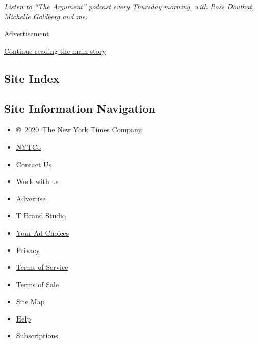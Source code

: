 \emph{Listen to}
\href{https://www.nytimes3xbfgragh.onion/column/the-argument}{\emph{``The
Argument'' podcast}} \emph{every Thursday morning, with Ross Douthat,
Michelle Goldberg and me.}

Advertisement

\protect\hyperlink{after-bottom}{Continue reading the main story}

\hypertarget{site-index}{%
\subsection{Site Index}\label{site-index}}

\hypertarget{site-information-navigation}{%
\subsection{Site Information
Navigation}\label{site-information-navigation}}

\begin{itemize}
\tightlist
\item
  \href{https://help.nytimes3xbfgragh.onion/hc/en-us/articles/115014792127-Copyright-notice}{©~2020~The
  New York Times Company}
\end{itemize}

\begin{itemize}
\tightlist
\item
  \href{https://www.nytco.com/}{NYTCo}
\item
  \href{https://help.nytimes3xbfgragh.onion/hc/en-us/articles/115015385887-Contact-Us}{Contact
  Us}
\item
  \href{https://www.nytco.com/careers/}{Work with us}
\item
  \href{https://nytmediakit.com/}{Advertise}
\item
  \href{http://www.tbrandstudio.com/}{T Brand Studio}
\item
  \href{https://www.nytimes3xbfgragh.onion/privacy/cookie-policy\#how-do-i-manage-trackers}{Your
  Ad Choices}
\item
  \href{https://www.nytimes3xbfgragh.onion/privacy}{Privacy}
\item
  \href{https://help.nytimes3xbfgragh.onion/hc/en-us/articles/115014893428-Terms-of-service}{Terms
  of Service}
\item
  \href{https://help.nytimes3xbfgragh.onion/hc/en-us/articles/115014893968-Terms-of-sale}{Terms
  of Sale}
\item
  \href{https://spiderbites.nytimes3xbfgragh.onion}{Site Map}
\item
  \href{https://help.nytimes3xbfgragh.onion/hc/en-us}{Help}
\item
  \href{https://www.nytimes3xbfgragh.onion/subscription?campaignId=37WXW}{Subscriptions}
\end{itemize}
